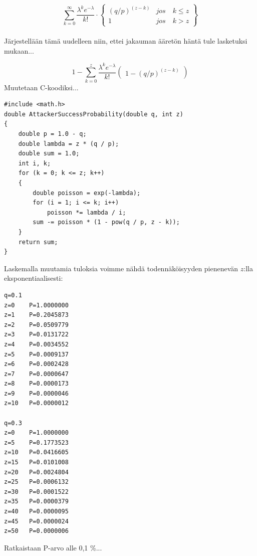 \documentclass{article}
\begin{document}
\paragraph{}
\begin{equation*}
   {\sum_{k=0}^{\infty} \frac{\lambda^{k} e^{ - \lambda}}{k!}}\cdot
   \begin{Bmatrix}
 (q/p)^{(z - k)} & jos\quad k \leq z \\
  1 & jos\quad k > z
 \end{Bmatrix}
\end{equation*}

\paragraph{} Järjestellään tämä uudelleen niin, ettei jakauman ääretön häntä tule lasketuksi mukaan...

\begin{equation*}
   {1 - \sum_{k=0}^{z} \frac{\lambda^{k} e^{ - \lambda}}{k!}}
   \begin{pmatrix}1 - (q/p)^{(z - k)}
  \end{pmatrix}
\end{equation*}
\newpage
\noindent Muutetaan C-koodiksi...
\begin{verbatim}
#include <math.h>
double AttackerSuccessProbability(double q, int z)
{
    double p = 1.0 - q;
    double lambda = z * (q / p);
    double sum = 1.0;
    int i, k;
    for (k = 0; k <= z; k++)
    {
        double poisson = exp(-lambda);
        for (i = 1; i <= k; i++)
            poisson *= lambda / i;
        sum -= poisson * (1 - pow(q / p, z - k));
    }
    return sum;
}
\end{verbatim}

\noindent Laskemalla muutamia tuloksia voimme nähdä todennäköisyyden pienenevän $z$:lla eksponentiaalisesti:

\begin{verbatim}
q=0.1
z=0    P=1.0000000
z=1    P=0.2045873
z=2    P=0.0509779
z=3    P=0.0131722
z=4    P=0.0034552
z=5    P=0.0009137
z=6    P=0.0002428
z=7    P=0.0000647
z=8    P=0.0000173
z=9    P=0.0000046
z=10   P=0.0000012

q=0.3
z=0    P=1.0000000
z=5    P=0.1773523
z=10   P=0.0416605
z=15   P=0.0101008
z=20   P=0.0024804
z=25   P=0.0006132
z=30   P=0.0001522
z=35   P=0.0000379
z=40   P=0.0000095
z=45   P=0.0000024
z=50   P=0.0000006
\end{verbatim}

\noindent Ratkaistaan P-arvo alle 0,1 \%...
\end{document}
